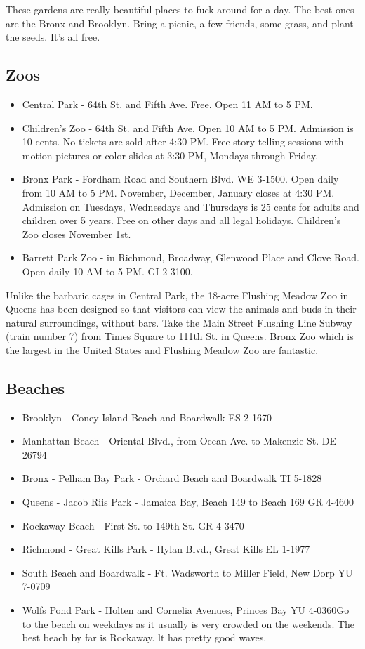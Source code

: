\documentclass[11pt,twoside,a4paper]{book}
\begin{document}
These gardens are really beautiful places to fuck around for a day. The best ones are the Bronx and Brooklyn. Bring a picnic, a few friends, some grass, and plant the seeds. It's all free.

\subsection{Zoos}
\begin{itemize}
\item Central Park - 64th St. and Fifth Ave. Free. Open 11 AM to 5 PM. 
\item Children's Zoo - 64th St. and Fifth Ave. Open 10 AM to 5 PM. Admission is 10 cents. No tickets are sold after 4:30 PM. Free story-telling sessions with motion pictures or color slides at 3:30 PM, Mondays through Friday. 
\item Bronx Park - Fordham Road and Southern Blvd. WE 3-1500. Open daily from 10 AM to 5 PM. November, December, January closes at 4:30 PM. Admission on Tuesdays, Wednesdays and Thursdays is 25 cents for adults and children over 5 years. Free on other days and all legal holidays. Children's Zoo closes November 1st. 
\item Barrett Park Zoo - in Richmond, Broadway, Glenwood Place and Clove Road. Open daily 10 AM to 5 PM. GI 2-3100.~\\
\end{itemize}

Unlike the barbaric cages in Central Park, the 18-acre Flushing Meadow Zoo in Queens has been designed so that visitors can view the animals and buds in their natural surroundings, without bars. Take the Main Street Flushing Line Subway (train number 7) from Times Square to 111th St. in Queens. Bronx Zoo which is the largest in the United States and Flushing Meadow Zoo are fantastic.

\subsection{Beaches}
\begin{itemize}
\item Brooklyn - Coney Island Beach and Boardwalk ES 2-1670 
\item Manhattan Beach - Oriental Blvd., from Ocean Ave. to Makenzie St. DE 26794 
\item Bronx - Pelham Bay Park - Orchard Beach and Boardwalk TI 5-1828 
\item Queens - Jacob Riis Park - Jamaica Bay, Beach 149 to Beach 169 GR 4-4600
\item Rockaway Beach - First St. to 149th St. GR 4-3470  
\item Richmond - Great Kills Park - Hylan Blvd., Great Kills EL 1-1977 
\item South Beach and Boardwalk - Ft. Wadsworth to Miller Field, New Dorp YU 7-0709 
\item Wolfs Pond Park - Holten and Cornelia Avenues, Princes Bay YU 4-0360Go to the beach on weekdays as it usually is very crowded on the weekends. The best beach by far is Rockaway. lt has pretty good waves.
\end{itemize}
\end{document}
